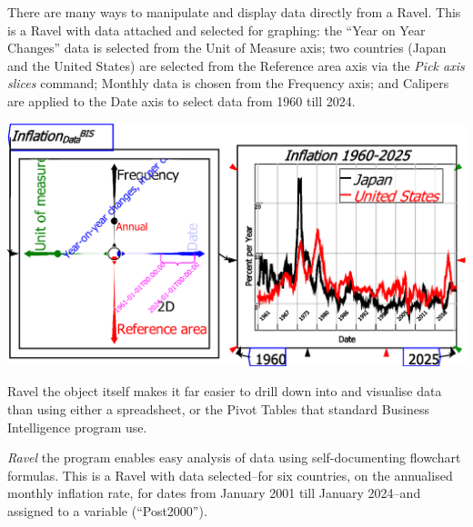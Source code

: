 There are many ways to manipulate and display data directly from a
Ravel. This is a Ravel with data attached and selected for graphing:
the ``Year on Year Changes'' data is selected from the Unit of Measure
axis; two countries (Japan and the United States) are selected from
the Reference area axis via the \emph{Pick axis slices} command; Monthly
data is chosen from the Frequency axis; and Calipers are applied to
the Date axis to select data from 1960 till 2024.

\begin{center}
\includegraphics[width=\textwidth]{images/01BRavelDataInflationSelected}
\end{center}

Ravel the object itself makes it far easier to drill down into and
visualise data than using either a spreadsheet, or the Pivot Tables
that standard Business Intelligence program use.

\emph{Ravel} the program enables easy analysis of data using self-documenting
flowchart formulas. This is a Ravel with data selected--for six countries,
on the annualised monthly inflation rate, for dates from January 2001
till January 2024--and assigned to a variable (``Post2000'').


